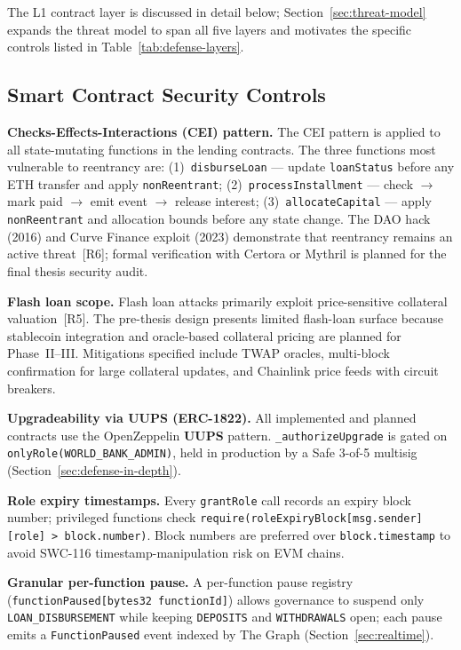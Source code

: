 \documentclass[12pt,a4paper]{report}
\begin{document}
The L1 contract layer is discussed in detail below; Section~\ref{sec:threat-model} expands the threat model to span all five layers and motivates the specific controls listed in Table~\ref{tab:defense-layers}.

\subsection{Smart Contract Security Controls}
\label{sec:contract-security}

\textbf{Checks-Effects-Interactions (CEI) pattern.} The CEI pattern is applied to all state-mutating functions in the lending contracts. The three functions most vulnerable to reentrancy are: (1)~\texttt{disburseLoan} --- update \texttt{loanStatus} before any ETH transfer and apply \texttt{nonReentrant}; (2)~\texttt{processInstallment} --- check $\to$ mark paid $\to$ emit event $\to$ release interest; (3)~\texttt{allocateCapital} --- apply \texttt{nonReentrant} and allocation bounds before any state change. The DAO hack (2016) and Curve Finance exploit (2023) demonstrate that reentrancy remains an active threat~[R6]; formal verification with Certora or Mythril is planned for the final thesis security audit.

\textbf{Flash loan scope.} Flash loan attacks primarily exploit price-sensitive collateral valuation~[R5]. The pre-thesis design presents limited flash-loan surface because stablecoin integration and oracle-based collateral pricing are planned for Phase~II--III. Mitigations specified include TWAP oracles, multi-block confirmation for large collateral updates, and Chainlink price feeds with circuit breakers.

\textbf{Upgradeability via UUPS (ERC-1822).} All implemented and planned contracts use the OpenZeppelin \textbf{UUPS} pattern. \texttt{\_authorizeUpgrade} is gated on \texttt{onlyRole(WORLD\_BANK\_ADMIN)}, held in production by a Safe 3-of-5 multisig (Section~\ref{sec:defense-in-depth}).

\textbf{Role expiry timestamps.} Every \texttt{grantRole} call records an expiry block number; privileged functions check \texttt{require(roleExpiryBlock[msg.sender][role] > block.number)}. Block numbers are preferred over \texttt{block.timestamp} to avoid SWC-116 timestamp-manipulation risk on EVM chains.

\textbf{Granular per-function pause.} A per-function pause registry (\texttt{functionPaused[bytes32 functionId]}) allows governance to suspend only \texttt{LOAN\_DISBURSEMENT} while keeping \texttt{DEPOSITS} and \texttt{WITHDRAWALS} open; each pause emits a \texttt{FunctionPaused} event indexed by The Graph (Section~\ref{sec:realtime}).
\end{document}
